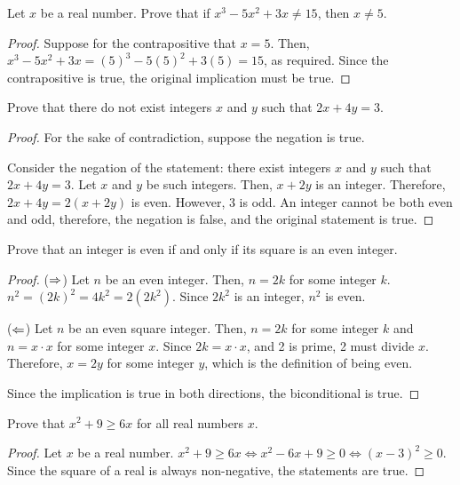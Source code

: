 \question Let $x$ be a real number. Prove that if $x^3-5x^2+3x \neq 15$, then $x \neq 5$.
\begin{proof}
  Suppose for the contrapositive that $x=5$.
  Then, $x^3-5x^2+3x=(5)^3-5(5)^2+3(5)=15$, as required.
  Since the contrapositive is true, the original implication must be true.
\end{proof}


\question Prove that there do not exist integers $x$ and $y$ such that $2x + 4y = 3$.
\begin{proof}
  For the sake of contradiction, suppose the negation is true.

  Consider the negation of the statement: there exist integers $x$ and $y$ such that $2x + 4y = 3$.
  Let $x$ and $y$ be such integers.
  Then, $x+2y$ is an integer.
  Therefore, $2x+4y=2(x+2y)$ is even.
  However, 3 is odd.
  An integer cannot be both even and odd, therefore, the negation is false, and the original statement is true.
\end{proof}


\question Prove that an integer is even if and only if its square is an even integer.
\begin{proof}
  ($\Rightarrow$) Let $n$ be an even integer.
  Then, $n=2k$ for some integer $k$.
  $n^2=(2k)^2=4k^2=2(2k^2)$.
  Since $2k^2$ is an integer, $n^2$ is even.

  ($\Leftarrow$) Let $n$ be an even square integer.
  Then, $n=2k$ for some integer $k$ and $n=x\cdot x$ for some integer $x$.
  Since $2k=x\cdot x$, and 2 is prime, 2 must divide $x$.
  Therefore, $x=2y$ for some integer $y$, which is the definition of being even.

  Since the implication is true in both directions, the biconditional is true.
\end{proof}




\question Prove that $x^2 + 9 \geq 6x$ for all real numbers $x$.
\begin{proof}
  Let $x$ be a real number.
  $x^2+9 \geq 6x \iff x^2-6x+9 \geq 0 \iff (x-3)^2 \geq 0$.
  Since the square of a real is always non-negative, the statements are true.
\end{proof}


